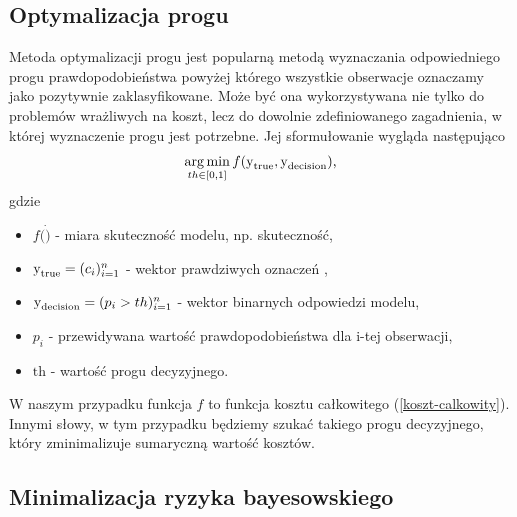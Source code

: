 \documentclass[openany]{book}
\DeclareMathOperator*{\argmin}{arg\,min}
\begin{document}
	\subsection{Optymalizacja progu}
		Metoda optymalizacji progu jest popularną metodą wyznaczania odpowiedniego progu prawdopodobieństwa powyżej którego wszystkie obserwacje oznaczamy jako pozytywnie zaklasyfikowane. Może być ona wykorzystywana nie tylko do problemów wrażliwych na koszt, lecz do dowolnie zdefiniowanego zagadnienia, w której wyznaczenie progu jest potrzebne. Jej sformułowanie wygląda następująco
		$$ \argmin_{th \in [0,1]} f(\ylab{y}{true}, \ylab{y}{decision}) \text{,} $$
		gdzie 
		\begin{itemize}
			\item $ f(\dot) $ - miara skuteczność modelu, np. skuteczność,
			\item $ \text{y}_{\text{true}} = (c_i)_{i=1}^n $ - wektor prawdziwych oznaczeń ,
			\item $ \text{y}_{\text{decision}} = (p_i > th)_{i=1}^n $ - wektor binarnych odpowiedzi modelu,
			\item $ p_i $ - przewidywana wartość prawdopodobieństwa dla i-tej obserwacji,
			\item $ \text{th} $ - wartość progu decyzyjnego.
		\end{itemize}{}
		W naszym przypadku funkcja $f$ to funkcja kosztu całkowitego (\ref{koszt-calkowity}). Innymi słowy, w tym przypadku będziemy szukać takiego progu decyzyjnego, który zminimalizuje sumaryczną wartość kosztów.
		
	\subsection{Minimalizacja ryzyka bayesowskiego}
	
\end{document}
